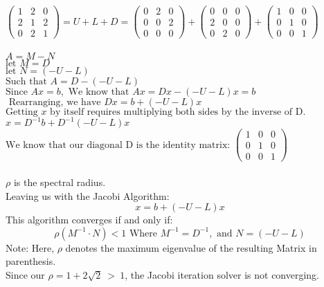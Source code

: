 \documentclass{article}
\begin{document}
\begin{enumerate}
\begin{enumerate}
            $ \begin{pmatrix} 1 & 2 & 0\\ 2 & 1 & 2\\ 0 & 2 & 1 \end{pmatrix} = U + L + D =\begin{pmatrix} 0 & 2 & 0\\ 0 & 0 & 2\\ 0 & 0 & 0 \end{pmatrix} +\begin{pmatrix} 0 & 0 & 0\\ 2 & 0 & 0\\ 0 & 2 & 0 \end{pmatrix} + \begin{pmatrix} 1 & 0 & 0\\ 0 & 1 & 0\\ 0 & 0 & 1 \end{pmatrix} $\\
            \\
            $ A = M - N $\\
            $ \text{let }M = D $\\
            $ \text{let }N = (-U-L) $\\
            $ \text{Such that }A = D - (-U-L) $\\
            $ \text{Since }Ax = b, \text{ We know that } Ax = Dx - (-U-L)x = b $\\
            $ \text{ Rearranging, we have } Dx = b + (-U-L)x $\\
            $ \text{Getting $x$ by itself requires multiplying both sides by the inverse of D.} $\\
            $ x = D^{-1}b + D^{-1}(-U-L)x $\\
            $ \text{We know that our diagonal D is the identity matrix: }\begin{pmatrix} 1 & 0 & 0\\ 0 & 1 & 0\\ 0 & 0 & 1 \end{pmatrix} $\\
            \\
            $\rho$ is the spectral radius. \\
            Leaving us with the Jacobi Algorithm:
            $$x = b + (-U-L)x  $$   
            This algorithm converges if and only if: \\
            $$\rho(M^{-1}\cdot N)<1 \text{ Where } M^{-1} = D^{-1}, \text{ and } N = (-U-L) $$
            Note: Here, $\rho$ denotes the maximum eigenvalue of the resulting Matrix in parenthesis.\\
            Since our $\rho = 1+2\sqrt2 \: >\: 1$, the Jacobi iteration solver is not converging.
            
        \color{black}
        
    \end{enumerate}    

\end{enumerate}
\end{document}
